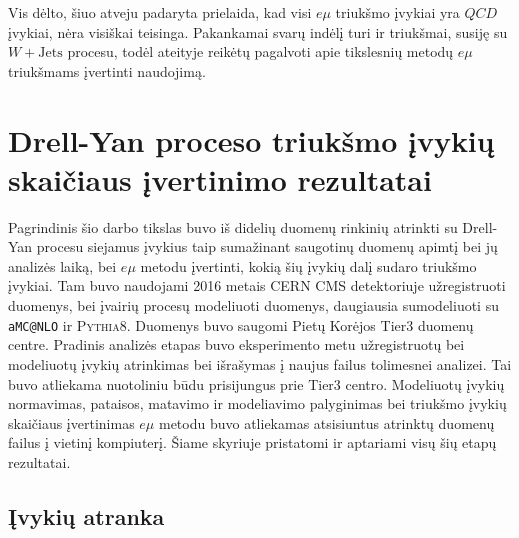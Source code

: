 \documentclass[a4paper, 12pt]{article}
\newcommand{\ttt}[1]{\texttt{#1}}
\newcommand{\emu}{e\mu}
\newcommand{\WJets}{W\! +\!\mathrm{Jets}}
\begin{document}
Vis dėlto, šiuo atveju padaryta prielaida, kad visi $\emu$ triukšmo įvykiai yra $QCD$ įvykiai, nėra visiškai teisinga.
Pakankamai svarų indėlį turi ir triukšmai, susiję su $\WJets$ procesu, todėl ateityje reikėtų pagalvoti apie tikslesnių
metodų $e\mu$ triukšmams įvertinti naudojimą.


\section{Drell-Yan proceso triukšmo įvykių skaičiaus įvertinimo rezultatai}

Pagrindinis šio darbo tikslas buvo iš didelių duomenų rinkinių atrinkti su Drell-Yan procesu siejamus įvykius taip
sumažinant saugotinų duomenų apimtį bei jų analizės laiką, bei $\emu$ metodu įvertinti, kokią šių įvykių dalį sudaro
triukšmo įvykiai.
Tam buvo naudojami 2016 metais CERN CMS detektoriuje užregistruoti duomenys, bei įvairių procesų modeliuoti duomenys,
daugiausia sumodeliuoti su \ttt{aMC@NLO} ir \textsc{Pythia8}.
Duomenys buvo saugomi Pietų Korėjos Tier3 duomenų centre.
Pradinis analizės etapas buvo eksperimento metu užregistruotų bei modeliuotų įvykių atrinkimas bei išrašymas į naujus
failus tolimesnei analizei.
Tai buvo atliekama nuotoliniu būdu prisijungus prie Tier3 centro.
Modeliuotų įvykių normavimas, pataisos, matavimo ir modeliavimo palyginimas bei triukšmo įvykių skaičiaus įvertinimas
$\emu$ metodu buvo atliekamas atsisiuntus atrinktų duomenų failus į vietinį kompiuterį.
Šiame skyriuje pristatomi ir aptariami visų šių etapų rezultatai.


\subsection{Įvykių atranka}
\end{document}
